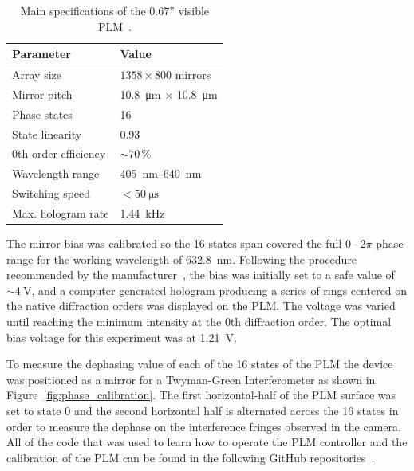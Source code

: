 \documentclass[11pt, twoside]{article}
\begin{document}
\begin{table}[htbp]
    \centering
    \caption{Main specifications of the 0.67'' visible PLM~\cite{tiplmguide}.}
    \label{tab:plm_specs}
    \begin{tabular}{ll}
        \toprule
        Parameter & Value \\
        \midrule
        Array size        & $1358 \times 800$ mirrors \\
        Mirror pitch      & \SI{10.8}{\micro\meter} $\times$ \SI{10.8}{\micro\meter} \\
        Phase states      & 16 \\
        State linearity   & 0.93 \\
        0th order efficiency & $\sim 70\,\%$ \\
        Wavelength range  & \SIrange{405}{640}{\nano\meter} \\
        Switching speed   & $< \SI{50}{\micro\second}$ \\
        Max. hologram rate & \SI{1.44}{\kilo\hertz} \\
        \bottomrule
    \end{tabular}
\end{table}

The mirror bias was calibrated so the 16 states span covered the full $0$ --$2\pi$ phase range for the working wavelength of \SI{632.8}{\nano\meter}. Following the procedure recommended by the manufacturer~\cite{tiplmguide}, the bias was initially set to a safe value of $\sim\SI{4}{\volt}$, and a computer generated hologram producing a series of rings centered on the native diffraction orders was displayed on the PLM. The voltage was varied until reaching the minimum intensity at the 0th diffraction order. The optimal bias voltage for this experiment was at \SI{1.21}{\volt}.

To measure the dephasing value of each of the 16 states of the PLM the device was positioned as a mirror for a Twyman-Green Interferometer as shown in Figure~\ref{fig:phase_calibration}. The first horizontal-half of the PLM surface was set to state 0 and the second horizontal half is alternated across the 16 states in order to measure the dephase on the interference fringes observed in the camera. All of the code that was used to learn how to operate the PLM controller and the calibration of the PLM can be found in the following GitHub repositories~\cite{barraza2026plmcontroller,structuredlightlab2026plmctrl}.
\end{document}
